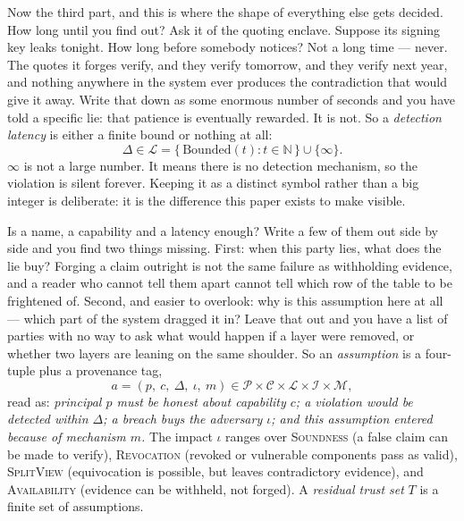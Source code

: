 \documentclass[11pt]{article}
\newcommand{\Never}{\infty}
\begin{document}
Now the third part, and this is where the shape of everything else gets
decided. How long until you find out? Ask it of the quoting enclave. Suppose
its signing key leaks tonight. How long before somebody notices? Not a long
time --- never. The quotes it forges verify, and they verify tomorrow, and
they verify next year, and nothing anywhere in the system ever produces the
contradiction that would give it away. Write that down as some enormous
number of seconds and you have told a specific lie: that patience is
eventually rewarded. It is not. So a \emph{detection latency} is either a
finite bound or nothing at all:
\begin{equation}
\Delta \in \mathcal{L} = \{\,\mathrm{Bounded}(t) : t \in \mathbb{N}\,\}
                          \cup \{\Never\}.
\end{equation}
$\Never$ is not a large number. It means there is no detection mechanism, so
the violation is silent forever. Keeping it as a distinct symbol rather than
a big integer is deliberate: it is the difference this paper exists to make
visible.

Is a name, a capability and a latency enough? Write a few of them out side by
side and you find two things missing. First: when this party lies,
what does the lie buy? Forging a claim outright is not the same failure as
withholding evidence, and a reader who cannot tell them apart cannot tell
which row of the table to be frightened of. Second, and easier to overlook:
why is this assumption here at all --- which part of the system dragged it
in? Leave that out and you have a list of parties with no way to ask what
would happen if a layer were removed, or whether two layers are leaning on
the same shoulder. So an \emph{assumption} is a four-tuple plus a provenance
tag,
\begin{equation}
a = (p,\ c,\ \Delta,\ \iota,\ m)
  \in \mathcal{P} \times \mathcal{C} \times \mathcal{L}
      \times \mathcal{I} \times \mathcal{M},
\end{equation}
read as: \emph{principal $p$ must be honest about capability $c$; a violation
would be detected within $\Delta$; a breach buys the adversary $\iota$; and
this assumption entered because of mechanism $m$.} The impact $\iota$ ranges
over \textsc{Soundness} (a false claim can be made to verify),
\textsc{Revocation} (revoked or vulnerable components pass as valid),
\textsc{SplitView} (equivocation is possible, but leaves contradictory
evidence), and \textsc{Availability} (evidence can be withheld, not forged).
A \emph{residual trust set} $T$ is a finite set of assumptions.
\end{document}
